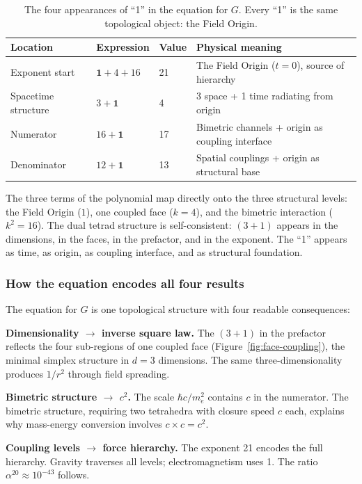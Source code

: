 \documentclass[aps,prd,preprint,superscriptaddress,showpacs,preprintnumbers,amsmath,amssymb,nofootinbib]{revtex4-2}
\begin{document}
\begin{table}[H]
\centering
\begin{tabular*}{\textwidth}{@{\extracolsep{\fill}} llll @{}}
\toprule
\textbf{Location} & \textbf{Expression} & \textbf{Value} & \textbf{Physical meaning} \\
\midrule
Exponent start & $\mathbf{1} + 4 + 16$ & 21 & The Field Origin ($t = 0$), source of hierarchy \\
Spacetime structure & $3 + \mathbf{1}$ & 4 & 3 space + 1 time radiating from origin \\
Numerator & $16 + \mathbf{1}$ & 17 & Bimetric channels + origin as coupling interface \\
Denominator & $12 + \mathbf{1}$ & 13 & Spatial couplings + origin as structural base \\
\bottomrule
\end{tabular*}
\caption{The four appearances of ``1'' in the equation for $G$. Every ``1'' is the same topological object: the Field Origin.}
\label{tab:ones}
\end{table}

The three terms of the polynomial map directly onto the three structural levels: the Field Origin ($1$), one coupled face ($k = 4$), and the bimetric interaction ($k^2 = 16$). The dual tetrad structure is self-consistent: $(3{+}1)$ appears in the dimensions, in the faces, in the prefactor, and in the exponent. The ``1'' appears as time, as origin, as coupling interface, and as structural foundation.

\subsubsection*{How the equation encodes all four results}

The equation for $G$ is one topological structure with four readable consequences:

\textbf{Dimensionality $\rightarrow$ inverse square law.} The $(3+1)$ in the prefactor reflects the four sub-regions of one coupled face (Figure~\ref{fig:face-coupling}), the minimal simplex structure in $d = 3$ dimensions. The same three-dimensionality produces $1/r^2$ through field spreading.

\textbf{Bimetric structure $\rightarrow$ $c^2$.} The scale $\hbar c/m_e^2$ contains $c$ in the numerator. The bimetric structure, requiring two tetrahedra with closure speed $c$ each, explains why mass-energy conversion involves $c \times c = c^2$.

\textbf{Coupling levels $\rightarrow$ force hierarchy.} The exponent 21 encodes the full hierarchy. Gravity traverses all levels; electromagnetism uses 1. The ratio $\alpha^{20} \approx 10^{-43}$ follows.
\end{document}
